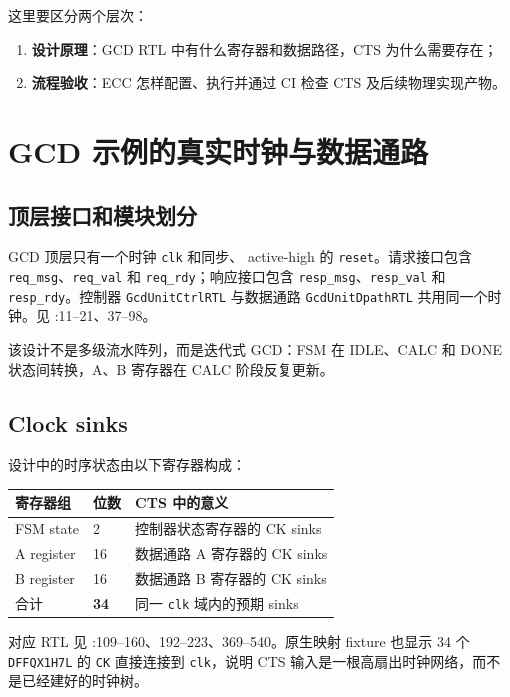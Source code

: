 \documentclass[UTF8,a4paper,11pt,fontset=fandol]{ctexart}
\newcommand{\code}[1]{\nolinkurl{#1}}
\begin{document}
这里要区分两个层次：
\begin{enumerate}
  \item \textbf{设计原理}：GCD RTL 中有什么寄存器和数据路径，CTS 为什么需要存在；
  \item \textbf{流程验收}：ECC 怎样配置、执行并通过 CI 检查 CTS 及后续物理实现产物。
\end{enumerate}

\section{GCD 示例的真实时钟与数据通路}

\subsection{顶层接口和模块划分}

GCD 顶层只有一个时钟 \code{clk} 和同步、 active-high 的 \code{reset}。请求接口包含 \code{req_msg}、\code{req_val} 和 \code{req_rdy}；响应接口包含 \code{resp_msg}、\code{resp_val} 和 \code{resp_rdy}。控制器 \code{GcdUnitCtrlRTL} 与数据通路 \code{GcdUnitDpathRTL} 共用同一个时钟。见 :11--21、37--98。

该设计不是多级流水阵列，而是迭代式 GCD：FSM 在 IDLE、CALC 和 DONE 状态间转换，A、B 寄存器在 CALC 阶段反复更新。

\subsection{Clock sinks}

设计中的时序状态由以下寄存器构成：
\begin{center}
\begin{tabular}{lll}
\toprule
寄存器组 & 位数 & CTS 中的意义 \\
\midrule
FSM state & 2 & 控制器状态寄存器的 CK sinks \\
A register & 16 & 数据通路 A 寄存器的 CK sinks \\
B register & 16 & 数据通路 B 寄存器的 CK sinks \\
\midrule
合计 & \textbf{34} & 同一 \code{clk} 域内的预期 sinks \\
\bottomrule
\end{tabular}
\end{center}

对应 RTL 见 :109--160、192--223、369--540。原生映射 fixture 也显示 34 个 \code{DFFQX1H7L} 的 \code{CK} 直接连接到 \code{clk}，说明 CTS 输入是一根高扇出时钟网络，而不是已经建好的时钟树。
\end{document}
